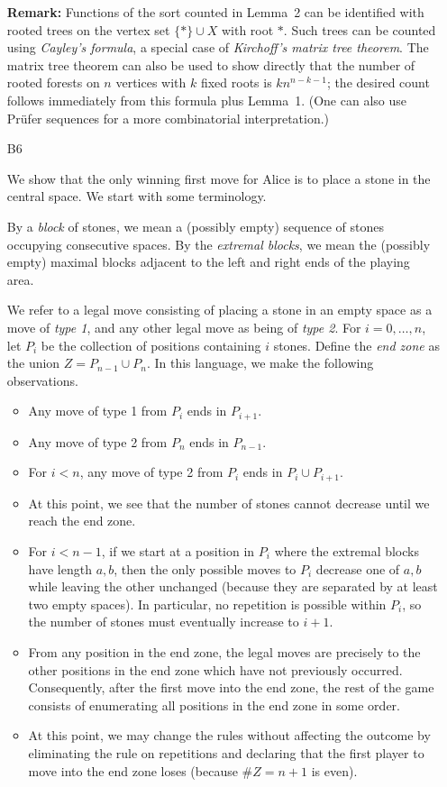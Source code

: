 \documentclass[amssymb,twocolumn,pra,10pt,aps]{revtex4-1}
\begin{document}
\begin{itemize}
\textbf{Remark:}
Functions of the sort counted in Lemma~2 can be identified with rooted trees on the vertex set $\{*\} \cup X$ with root $*$. Such trees can be counted using \emph{Cayley's formula}, a special case of \emph{Kirchoff's matrix tree theorem}. The matrix tree theorem can also be used to show directly that the number of rooted forests on $n$ vertices with $k$ fixed roots is $k n^{n-k-1}$; the desired count follows immediately from this formula plus Lemma~1. (One can also use Pr\"ufer sequences for a more combinatorial interpretation.)

\item[B6]

We show that the only winning first move for Alice is to place a stone in the central space. We start with some terminology.

By a \emph{block} of stones, we mean a (possibly empty) sequence of stones occupying consecutive spaces. By the \emph{extremal blocks}, we mean the (possibly empty) maximal blocks adjacent to the left and right ends of the playing area.

We refer to a legal move consisting of placing a stone in an empty space as a move of \emph{type 1}, and any other legal move as being of \emph{type 2}.
For $i=0,\dots,n$, let $P_i$ be the collection of positions containing $i$ stones. Define the \emph{end zone} as the union $Z = P_{n-1} \cup P_n$. In this language, we make the following observations.
\begin{itemize}
\item
Any move of type 1 from $P_i$ ends in $P_{i+1}$.
\item
Any move of type 2 from $P_n$ ends in $P_{n-1}$.
\item
For $i < n$, any move of type 2 from $P_i$ ends in $P_i \cup P_{i+1}$.
\item
At this point, we see that  the number of stones cannot decrease until we reach the end zone.
\item
For $i < n-1$, if we start at a position in $P_i$ where the extremal blocks have length $a,b$, then the only possible moves to $P_i$ decrease one of $a,b$ while leaving the other unchanged (because they are separated by at least two empty spaces). In particular, no repetition is possible within $P_i$, so the number of stones must eventually increase to $i+1$.
\item
From any position in the end zone, the legal moves are precisely to the other positions in the end zone which have not previously occurred. Consequently, after the first move into the end zone, the rest of the game consists of enumerating all positions in the end zone in some order.
\item
At this point, we may change the rules without affecting the outcome by eliminating the rule on repetitions and declaring that the first player to move into the end zone loses (because $\# Z = n+1$ is even).
\end{itemize}


\end{itemize}
\end{document}
